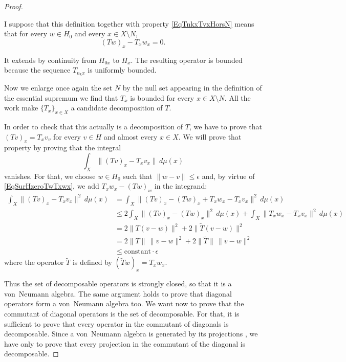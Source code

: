 \begin{proof}
	\begin{probleme}
		I suppose that this definition together with property \eqref{EqTnkxTvxHorsN} means that for every $w\in H_0$ and every $x\in X\setminus N$,
		\begin{equation}			\label{EqSurHzeroTwTxwx}
			(Tw)_x-T_xw_x=0.
		\end{equation}
	\end{probleme}

	It extends by continuity from $H_{0x}$ to $H_x$. The resulting operator is bounded because the sequence $T_{n_kx}$ is uniformly bounded.
	 
	Now we enlarge once again the set $N$ by the null set appearing in the definition of the essential supremum we find that $T_x$ is bounded for every $x\in X\setminus N$. All the work make $\{ T_x \}_{x\in X}$ a candidate decomposition of $T$. 

	In order to check that this actually is a decomposition of $T$, we have to prove that $(Tv)_x=T_xv_v$ for every $v\in H$ and almost every $x\in X$. We will prove that property by proving that the integral
	\begin{equation}
		\int_X\| (Tv)_x-T_xv_x \|\,d\mu(x)
	\end{equation}
	vanishes. For that, we choose $w\in H_0$ such that $\| w-v \|\leq\epsilon$ and, by virtue of \eqref{EqSurHzeroTwTxwx}, we add $T_xw_x-(Tw)_w$ in the integrand:
	\begin{equation}
		\begin{split}
			\int_X\| (Tv)_x-T_xv_x \|^2\,d\mu(x)	&= \int_X\| (Tv)_x -(Tw)_x+T_xw_x -T_xv_x \|^2\,d\mu(x)\\
								&\leq 2\int_X\| (Tv)_x-(Tw)_x\|^2\,d\mu(x)+\int_X\| T_xw_x-T_xv_x\|^2\,d\mu(x)\\
								&=2\| T(v-w) \|^2+2\| \tilde T(v-w) \|^2\\
								&=2\| T \|\,\| v-w \|^2 + 2\| \tilde T \|\,\| v-w \|^2\\
								&\leq \text{constant}\cdot \epsilon
		\end{split}
	\end{equation}
	where the operator $\tilde T$ is defined by $(\tilde Tw)_x=T_xw_x$.


	Thus the set of decomposable operators is strongly closed, so that it is a von~Neumann algebra. The same argument holds to prove that diagonal operators form a von~Neumann algebra too. We want now to prove that the commutant of diagonal operators is the set of decomposable. For that, it is sufficient to prove that every operator in the commutant of diagonals is decomposable. Since a von~Neumann algebra is generated by its projections , we have only to prove that every projection in the commutant of the diagonal is decomposable.


\end{proof}
